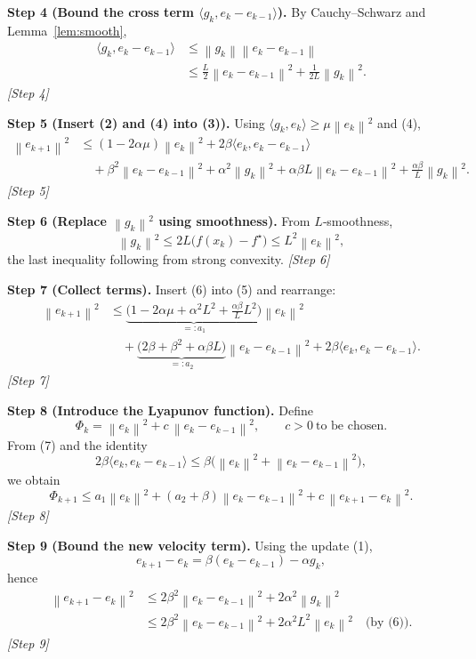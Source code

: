 \documentclass{article}
\newcommand{\norm}[1]{\left\lVert#1\right\rVert}
\begin{document}
\bigskip
\noindent\textbf{Step 4 (Bound the cross term $\langle g_{k},e_{k}-e_{k-1}\rangle$).}
By Cauchy–Schwarz and Lemma~\ref{lem:smooth},
\[
\begin{aligned}
\langle g_{k},e_{k}-e_{k-1}\rangle
&\le \norm{g_{k}}\norm{e_{k}-e_{k-1}}\\
&\le \frac{L}{2}\norm{e_{k}-e_{k-1}}^{2}+\frac{1}{2L}\norm{g_{k}}^{2}.
\end{aligned}
\tag{4}
\]
\textit{[Step 4]}

\bigskip
\noindent\textbf{Step 5 (Insert (2) and (4) into (3)).}
Using $\langle g_{k},e_{k}\rangle\ge\mu\norm{e_{k}}^{2}$ and (4),
\[
\begin{aligned}
\norm{e_{k+1}}^{2}
&\le (1-2\alpha\mu)\norm{e_{k}}^{2}
   +2\beta\langle e_{k},e_{k}-e_{k-1}\rangle\\
&\quad+\beta^{2}\norm{e_{k}-e_{k-1}}^{2}
   +\alpha^{2}\norm{g_{k}}^{2}
   +\alpha\beta L\norm{e_{k}-e_{k-1}}^{2}
   +\frac{\alpha\beta}{L}\norm{g_{k}}^{2}.
\end{aligned}
\tag{5}
\]
\textit{[Step 5]}

\bigskip
\noindent\textbf{Step 6 (Replace $\norm{g_{k}}^{2}$ using smoothness).}
From $L$‑smoothness,
\[
\norm{g_{k}}^{2}\le 2L\bigl(f(x_{k})-f^{\star}\bigr)\le L^{2}\norm{e_{k}}^{2},
\tag{6}
\]
the last inequality following from strong convexity.
\textit{[Step 6]}

\bigskip
\noindent\textbf{Step 7 (Collect terms).}
Insert (6) into (5) and rearrange:
\[
\begin{aligned}
\norm{e_{k+1}}^{2}
&\le \underbrace{\bigl(1-2\alpha\mu+\alpha^{2}L^{2}+\tfrac{\alpha\beta}{L}L^{2}\bigr)}_{=:a_{1}}\norm{e_{k}}^{2}\\
&\quad+ \underbrace{\bigl(2\beta+ \beta^{2}+ \alpha\beta L\bigr)}_{=:a_{2}}\norm{e_{k}-e_{k-1}}^{2}
   +2\beta\langle e_{k},e_{k}-e_{k-1}\rangle .
\end{aligned}
\tag{7}
\]
\textit{[Step 7]}

\bigskip
\noindent\textbf{Step 8 (Introduce the Lyapunov function).}
Define
\[
\Phi_{k}= \norm{e_{k}}^{2}+c\,\norm{e_{k}-e_{k-1}}^{2},
\qquad c>0\ \text{to be chosen.}
\tag{8}
\]
From (7) and the identity
\[
2\beta\langle e_{k},e_{k}-e_{k-1}\rangle
\le \beta\bigl(\norm{e_{k}}^{2}+\norm{e_{k}-e_{k-1}}^{2}\bigr),
\tag{9}
\]
we obtain
\[
\Phi_{k+1}\le a_{1}\norm{e_{k}}^{2}
          +(a_{2}+\beta)\norm{e_{k}-e_{k-1}}^{2}
          +c\,\norm{e_{k+1}-e_{k}}^{2}.
\tag{10}
\]
\textit{[Step 8]}

\bigskip
\noindent\textbf{Step 9 (Bound the new velocity term).}
Using the update (1),
\[
e_{k+1}-e_{k}= \beta(e_{k}-e_{k-1})-\alpha g_{k},
\]
hence
\[
\begin{aligned}
\norm{e_{k+1}-e_{k}}^{2}
&\le 2\beta^{2}\norm{e_{k}-e_{k-1}}^{2}
     +2\alpha^{2}\norm{g_{k}}^{2}\\
&\le 2\beta^{2}\norm{e_{k}-e_{k-1}}^{2}+2\alpha^{2}L^{2}\norm{e_{k}}^{2}
\quad\text{(by (6)).}
\end{aligned}
\tag{11}
\]
\textit{[Step 9]}
\end{document}
